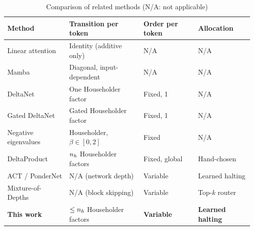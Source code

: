 \begin{table}[ht]
	\caption{Comparison of related methods (N/A: not applicable)}
	\centering
	\small
	\begin{tabular}{p{3.6cm} p{4.4cm} p{2.2cm} p{2.6cm}}
		\toprule
		\textbf{Method} & \textbf{Transition per token} & \textbf{Order per token} & \textbf{Allocation} \\
		\midrule
		Linear attention \cite{lineartransformers} & Identity (additive only) & N/A & N/A \\
		Mamba \cite{mamba} & Diagonal, input-dependent & N/A & N/A \\
		DeltaNet \cite{deltanet} & One Householder factor & Fixed, 1 & N/A \\
		Gated DeltaNet \cite{gateddeltanet} & Gated Householder factor & Fixed, 1 & N/A \\
		Negative eigenvalues \cite{negeig} & Householder, $\beta\in[0,2]$ & Fixed & N/A \\
		DeltaProduct \cite{deltaproduct} & $n_h$ Householder factors & Fixed, global & Hand-chosen \\
		ACT / PonderNet \cite{act,pondernet} & N/A (network depth) & Variable & Learned halting \\
		Mixture-of-Depths \cite{mod} & N/A (block skipping) & Variable & Top-$k$ router \\
		\midrule
		\textbf{This work} & $\le n_h$ Householder factors & \textbf{Variable} & \textbf{Learned halting} \\
		\bottomrule
	\end{tabular}
	\label{tab:related}
\end{table}

